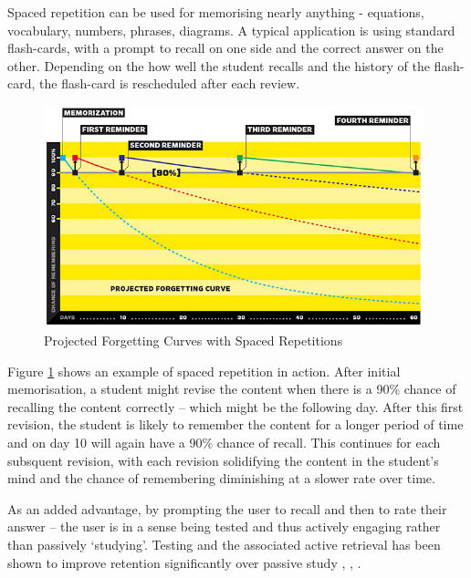 Spaced repetition can be used for memorising
nearly anything - equations, vocabulary, numbers, phrases, diagrams. A typical application
is using standard flash-cards, with a prompt to recall on one side and the correct answer on
the other. Depending on the how well the student recalls and the history of the flash-card, the
flash-card is rescheduled after each review. 

\begin{figure}[h!]
\includegraphics[width=11cm]{img/wired_forgetcurve.jpg}
\caption{Projected Forgetting Curves with Spaced Repetitions \cite{wolf_want_2008}}
\label{fig_projectedforgettingcurve}
\end{figure}

Figure \ref{fig_projectedforgettingcurve} shows an example of spaced repetition in
action. After initial memorisation, a student might revise the content when there
is a 90\% chance of recalling the content correctly -- which might be the following day.
After this first revision, the student is likely to remember the content for a longer
period of time and on day 10 will again have a 90\% chance of recall. This continues
for each subsquent revision, with each revision solidifying the content in the student's
mind and the chance of remembering diminishing at a slower rate over time.

As an added advantage, by prompting the user to recall and then to rate their answer -- the user
is in a sense being tested and thus actively engaging rather than passively `studying'.
Testing and the associated active retrieval has been shown to improve retention
significantly over passive study \cite{effects_of_recall_tests_1969},
\cite{retrieval_for_learning_2008}, \cite{power_of_testing_memory_2006}.

